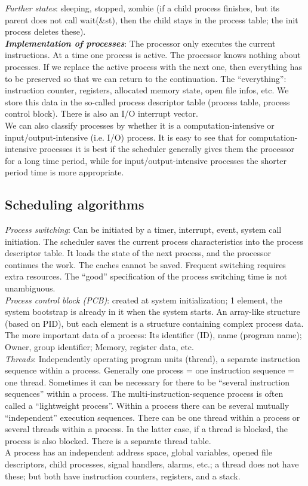 \documentclass[margin=0px]{article}
\begin{document}
\textit{Further states}: sleeping, stopped, zombie (if a child process finishes, but its parent does not call wait(\&st), then the child stays in the process table; the init process deletes these). \\
\textit{\textbf{Implementation of processes}}: The processor only executes the current instructions. At a time one process is active. The processor knows nothing about processes. If we replace the active process with the next one, then everything has to be preserved so that we can return to the continuation. The ``everything'': instruction counter, registers, allocated memory state, open file infos, etc. We store this data in the so-called process descriptor table (process table, process control block). There is also an I/O interrupt vector. \\
We can also classify processes by whether it is a computation-intensive or input/output-intensive (i.e. I/O) process. It is easy to see that for computation-intensive processes it is best if the scheduler generally gives them the processor for a long time period, while for input/output-intensive processes the shorter period time is more appropriate.

\subsection{Scheduling algorithms}

\textit{Process switching}: Can be initiated by a timer, interrupt, event, system call initiation. The scheduler saves the current process characteristics into the process descriptor table. It loads the state of the next process, and the processor continues the work. The caches cannot be saved. Frequent switching requires extra resources. The ``good'' specification of the process switching time is not unambiguous. \\
\textit{Process control block (PCB)}: created at system initialization; 1 element, the system bootstrap is already in it when the system starts. An array-like structure (based on PID), but each element is a structure containing complex process data. The more important data of a process: Its identifier (ID), name (program name); Owner, group identifier; Memory, register data, etc. \\
\textit{Threads}: Independently operating program units (thread), a separate instruction sequence within a process. Generally one process = one instruction sequence = one thread. Sometimes it can be necessary for there to be ``several instruction sequences'' within a process. The multi-instruction-sequence process is often called a ``lightweight process''. Within a process there can be several mutually ``independent'' execution sequences. There can be one thread within a process or several threads within a process. In the latter case, if a thread is blocked, the process is also blocked. There is a separate thread table. \\
A process has an independent address space, global variables, opened file descriptors, child processes, signal handlers, alarms, etc.; a thread does not have these; but both have instruction counters, registers, and a stack. \\ \\
\end{document}
